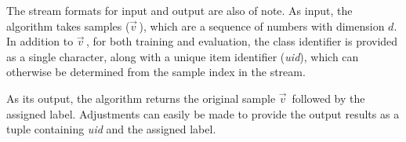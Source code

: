 \newcommand{\val}{$\vec{v}\,$\xspace}
The stream formats for input and output are also of note.
As input, the algorithm takes samples (\val), which are a sequence of numbers
with dimension $d$.
In addition to \val, for both training and evaluation, the class
identifier is provided as a single character, along with a unique item identifier
(\emph{uid}), which can otherwise be determined from the sample index in the stream.

As its output, the algorithm returns the original sample \val followed by the
assigned label. Adjustments can easily be made to provide the output results as
a tuple containing \emph{uid} and the assigned label.



